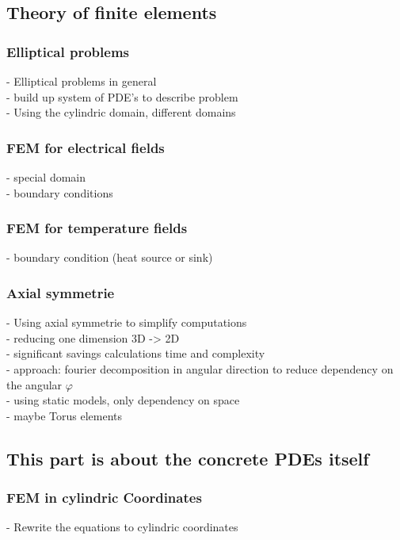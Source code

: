 \documentclass[parskip=half, titlepage=yes, 12pt, BCOR=12mm, DIV=calc]{scrartcl}
\begin{document}
\subsection{Theory of finite elements}

\subsubsection{Elliptical problems}
- Elliptical problems in general \\
- build up system of PDE's to describe problem \\
- Using the cylindric domain, different domains \\

\subsubsection{FEM for electrical fields}
- special domain \\
- boundary conditions \\

\subsubsection{FEM for temperature fields}
- boundary condition (heat source or sink) \\

\subsubsection{Axial symmetrie}
- Using axial symmetrie to simplify computations \\
- reducing one dimension 3D -> 2D \\
- significant savings calculations time and complexity \\
- approach: fourier decomposition in angular direction to reduce dependency on the angular $\varphi$ \\
- using static models, only dependency on space \\
- maybe Torus elements \\


\subsection{This part is about the concrete PDEs itself}

\subsubsection{FEM in cylindric Coordinates}
- Rewrite the equations to cylindric coordinates \\
 
\end{document}
